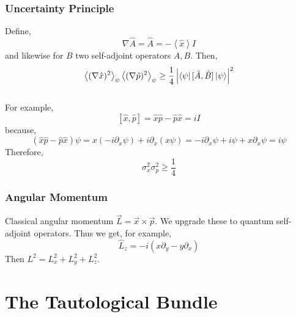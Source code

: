 \documentclass[12pt]{article}
\begin{document}
\subsubsection{Uncertainty Principle}
Define,
\[ \nabla \hat{A} = \hat{A} = - \left< \hat{x} \right> I \]
and likewise for $B$ two self-adjoint operators $A, B$. Then,
\[ \left< (\nabla \hat{x})^2 \right>_\psi \left< (\nabla \hat{p})^2 \right>_\psi \ge \frac{1}{4} \left| \left< \psi \right| [\hat{A}, \hat{B}] \left| \psi \right> \right|^2 \]
\bigskip\\
For example,
\[ [\hat{x}, \hat{p}] = \hat{x} \hat{p} - \hat{p} \hat{x} = i I \]
because,
\[ (\hat{x} \hat{p} - \hat{p} \hat{x}) \psi = x (-i \partial_x \psi) + i \partial_x (x \psi) = - i \partial_x \psi + i \psi + x \partial_x \psi = i \psi \]
Therefore,
\[ \sigma_x^2 \sigma_p^2 \ge \frac{1}{4} \]

\subsubsection{Angular Momentum}

Classical angular momentum $\vec{L} = \vec{x} \times \vec{p}$. We upgrade these to quantum self-adjoint operators. Thus we get, for example,
\[ \hat{L}_z = - i (x \partial_y - y \partial_x) \]
Then $L^2 = L_x^2 + L_y^2 + L_z^2$.  

\section{The Tautological Bundle}

\renewcommand{\C}{\mathbb{C}}
\end{document}
